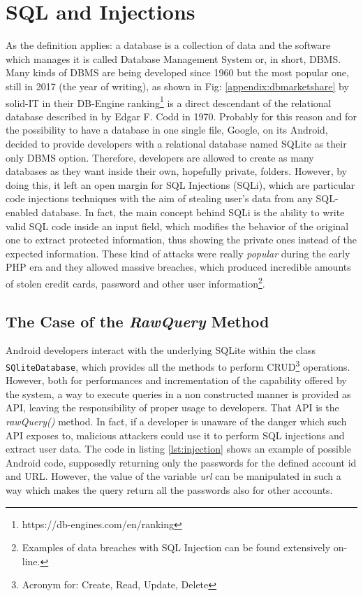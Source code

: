 \section{SQL and Injections}
As the definition applies: a database is a collection of data and the software which manages it is called Database Management System or, in short, DBMS. Many kinds of DBMS are being developed since 1960 but the most popular one, still in 2017 (the year of writing), as shown in Fig: \ref{appendix:dbmarketshare} by solid-IT in their DB-Engine ranking\footnote{https://db-engines.com/en/ranking} is a direct descendant of the relational database described in \cite{dbrelational} by Edgar F. Codd in 1970. Probably for this reason and for the possibility to have a database in one single file, Google, on its Android, decided to provide developers with a relational database named SQLite as their only DBMS option. Therefore, developers are allowed to create as many databases as they want inside their own, hopefully private, folders. However, by doing this, it left an open margin for SQL Injections (SQLi), which are particular code injections techniques with the aim of stealing user's data from any SQL-enabled database. In fact, the main concept behind SQLi is the ability to write valid SQL code inside an input field, which modifies the behavior of the original one to extract protected information, thus showing the private ones instead of the expected information. These kind of attacks were really \emph{popular} during the early PHP era and they allowed massive breaches, which produced incredible amounts of stolen credit cards, password and other user information\footnote{Examples of data breaches with SQL Injection can be found extensively on-line.}. 

\subsection{The Case of the \emph{RawQuery} Method}
Android developers interact with the underlying SQLite within the class \texttt{SQliteDatabase}, which provides all the methods to perform CRUD\footnote{Acronym for: Create, Read, Update, Delete} operations. However, both for performances and incrementation of the capability offered by the system, a way to execute queries in a non constructed manner is provided as API, leaving the responsibility of proper usage to developers. That API is the \emph{rawQuery()} method. In fact, if a developer is unaware of the danger which such API exposes to, malicious attackers could use it to perform SQL injections and extract user data. The code in listing \ref{lst:injection} shows an example of possible Android code, supposedly returning only the passwords for the defined account id and URL. However, the value of the variable \emph{url} can be manipulated in such a way which makes the query return all the passwords also for other accounts.\newline\newline

